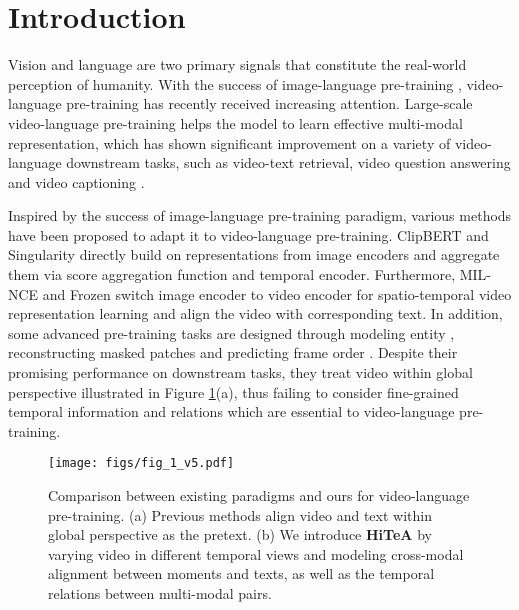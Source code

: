\documentclass[10pt,twocolumn,letterpaper]{article}
\newcommand{\modelname}{\textbf{HiTeA}\xspace}
\begin{document}
\section{Introduction}
Vision and language are two primary signals that constitute the real-world perception of humanity. With the success of image-language pre-training \cite{chen2020uniter,li2021align, wang2021simvlm,li2022mplug}, video-language pre-training \cite{miech2020milnce, li2020hero, li2022alpro, li2022lavender} has recently received increasing attention. 
Large-scale video-language pre-training helps the model to learn effective multi-modal representation, which has shown significant improvement on a variety of video-language downstream tasks, such as video-text retrieval, video question answering and video captioning \cite{xu2017msrvttqa, xu2016msrvtt, chen2011msvd, xiao2021nextqa, yu2019activitynetqa, li2021sumgda, maharaj2017lsmdcfib, torabi2016lsmdcmc}.


Inspired by the success of image-language pre-training paradigm, various methods \cite{li2022lavender, li2022alpro, fu2021violet, ge2022bridgeformer, li2020hero} have been proposed to adapt it to video-language pre-training. ClipBERT \cite{lei2021clipbert} and Singularity \cite{lei2022singularity} directly build on representations from image encoders and aggregate them via score aggregation function and temporal encoder. Furthermore, MIL-NCE \cite{miech2020milnce} and Frozen \cite{bain2021frozen} switch image encoder to video encoder for spatio-temporal video representation learning and align the video with corresponding text. In addition, some advanced pre-training tasks are designed through modeling entity \cite{li2022alpro}, reconstructing masked patches \cite{fu2021violet} and predicting frame order \cite{li2020hero, zellers2021merlot}. Despite their promising performance on downstream tasks, they treat video within global perspective illustrated in Figure \ref{fig:1}(a), thus failing to consider fine-grained temporal information and relations which are essential to video-language pre-training.


\begin{figure}
    \centering
    \texttt{[image: figs/fig\_1\_v5.pdf]}
\caption{Comparison between existing paradigms and ours for video-language pre-training. (a) Previous methods align video and text within global perspective as the pretext. (b) We introduce \modelname by varying video in different temporal views and modeling cross-modal alignment between moments and texts, as well as the temporal relations between multi-modal pairs.}
\label{fig:1}
\vspace{-2ex}
\end{figure}
\end{document}
